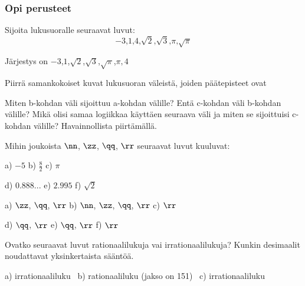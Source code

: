 \begin{tehtavasivu}

\subsubsection*{Opi perusteet}
\begin{tehtava}%
Sijoita lukusuoralle seuraavat luvut:
\[
\mbox{$-3$,$1$,$4$,$\sqrt{2}$,$\sqrt{3}$,$\pi$,$\sqrt{\pi}$}
\]
\begin{vastaus}
Järjestys on \mbox{$-3$,$1$,$\sqrt{2}$,$\sqrt{3}$,$\sqrt{\pi}$,$\pi,4$}
\end{vastaus}
\end{tehtava}

\begin{tehtava} %
Piirrä samankokoiset kuvat lukusuoran väleistä, joiden päätepisteet ovat 
\begin{alakohdat}
\end{alakohdat}
Miten b-kohdan väli sijoittuu a-kohdan välille? Entä c-kohdan väli b-kohdan välille? Mikä olisi samaa logiikkaa käyttäen seuraava väli ja miten se sijoittuisi c-kohdan välille? Havainnollista piirtämällä.
\begin{vastaus}
\begin{alakohdat}
\alakohta{}
\alakohta{}
\alakohta{}
\end{alakohdat}
\end{vastaus}
\end{tehtava}


\begin{tehtava}
Mihin joukoista $\nn$, $\zz$, $\qq$, $\rr$ seuraavat luvut kuuluvat:

a) $-5$ \qquad b) $\frac82$ \qquad c) $\pi$

d) $0.888...$ \qquad e) $2.995$ \qquad f) $\sqrt{2}$

\begin{vastaus}
a) $\zz$, $\qq$, $\rr$ \qquad b) $\nn$, $\zz$, $\qq$, $\rr$ \qquad c) $\rr$

d) $\qq$, $\rr$ \qquad e) $\qq$, $\rr$ \qquad f) $\rr$
\end{vastaus}
\end{tehtava}

\begin{tehtava}
Ovatko seuraavat luvut rationaalilukuja vai irrationaalilukuja? Kunkin desimaalit
noudattavat yksinkertaista sääntöä.
\begin{alakohdat}
\end{alakohdat}
\begin{vastaus}
a) irrationaaliluku \ b) rationaaliluku (jakso on 151) \ c) irrationaaliluku
\end{vastaus}
\end{tehtava}


\end{tehtavasivu}
